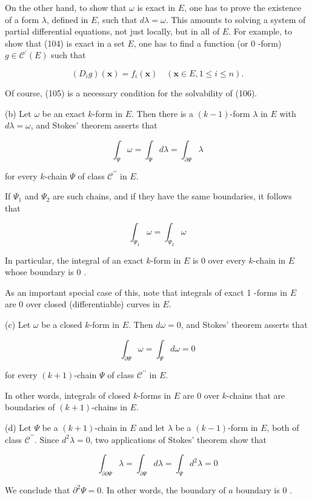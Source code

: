 \documentclass[10pt]{article}
\begin{document}
On the other hand, to show that $\omega$ is exact in $E$, one has to prove the existence of a form $\lambda$, defined in $E$, such that $d \lambda=\omega$. This amounts to solving a system of partial differential equations, not just locally, but in all of $E$. For example, to show that (104) is exact in a set $E$, one has to find a function (or 0 -form) $g \in \mathscr{C}^{\prime}(E)$ such that

$$
\left(D_{i} g\right)(\mathbf{x})=f_{i}(\mathbf{x}) \quad(\mathbf{x} \in E, 1 \leq i \leq n) .
$$

Of course, (105) is a necessary condition for the solvability of (106).

(b) Let $\omega$ be an exact $k$-form in $E$. Then there is a $(k-1)$-form $\lambda$ in $E$ with $d \lambda=\omega$, and Stokes' theorem asserts that

$$
\int_{\Psi} \omega=\int_{\Psi} d \lambda=\int_{\partial \Psi} \lambda
$$

for every $k$-chain $\Psi$ of class $\mathscr{C}^{\prime \prime}$ in $E$.

If $\Psi_{1}$ and $\Psi_{2}$ are such chains, and if they have the same boundaries, it follows that

$$
\int_{\Psi_{1}} \omega=\int_{\Psi_{2}} \omega
$$

In particular, the integral of an exact $k$-form in $E$ is 0 over every $k$-chain in $E$ whose boundary is 0 .

As an important special case of this, note that integrals of exact 1 -forms in $E$ are 0 over closed (differentiable) curves in $E$.

(c) Let $\omega$ be a closed $k$-form in $E$. Then $d \omega=0$, and Stokes' theorem asserts that

$$
\int_{\partial \Psi} \omega=\int_{\Psi} d \omega=0
$$

for every $(k+1)$-chain $\Psi$ of class $\mathscr{C}^{\prime \prime}$ in $E$.

In other words, integrals of closed $k$-forms in $E$ are 0 over $k$-chains that are boundaries of $(k+1)$-chains in $E$.

(d) Let $\Psi$ be a $(k+1)$-chain in $E$ and let $\lambda$ be a $(k-1)$-form in $E$, both of class $\mathscr{C}^{\prime \prime}$. Since $d^{2} \lambda=0$, two applications of Stokes' theorem show that

$$
\int_{\partial \partial \Psi} \lambda=\int_{\partial \Psi} d \lambda=\int_{\Psi} d^{2} \lambda=0
$$

We conclude that $\partial^{2} \Psi=0$. In other words, the boundary of $a$ boundary is 0 .
\end{document}
